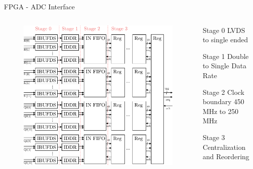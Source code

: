 \documentclass[10pt]{beamer}
\begin{document}
\begin{frame}{FPGA - ADC Interface}
  \begin{columns}[T]
    \begin{column}{.7\textwidth}
      \begin{figure}
        \centering
        \includegraphics[width=\textwidth]{figures/fpga_adc}
      \end{figure}
    \end{column}
    \begin{column}{.3\textwidth}
      \begin{block}{Stage 0}
        LVDS to single ended
      \end{block}
      \begin{block}{Stage 1}
        Double to Single Data Rate
      \end{block}
      \begin{block}{Stage 2}
        Clock boundary 450 MHz to 250 MHz
      \end{block}
      \begin{block}{Stage 3}
        Centralization and Reordering
      \end{block}
    \end{column}
  \end{columns}
\end{frame}
\end{document}
